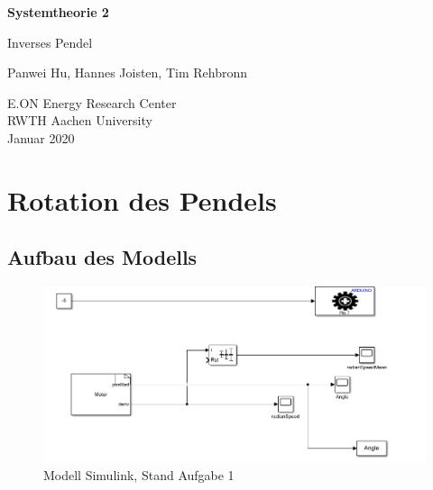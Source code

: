 \documentclass{article}
\begin{document}
\begin{titlepage}
    \begin{center}
        \vspace*{4cm}
 
        \Huge
        \textbf{Systemtheorie 2}
 
        \vspace{0.5cm}
        {\huge Inverses Pendel}
       
        \vspace{1.5cm}
 
        \LARGE{Panwei Hu, Hannes Joisten, Tim Rehbronn}
 
        \vfill
 
        \Large
        E.ON Energy Research Center \\
        RWTH Aachen University\\
        Januar 2020
 
    \end{center}
\end{titlepage}
\newpage
\tableofcontents
\newpage

\section{Rotation des Pendels}
\subsection{Aufbau des Modells}
\vspace{5mm}

\begin{figure}[h]
  \centering
  \begin{minipage}[b]{1\textwidth}
    \includegraphics[width=\textwidth]{model.png}
    \caption{Modell Simulink, Stand Aufgabe 1}
  \end{minipage}
\end{figure}
\vspace{5mm}
\end{document}
